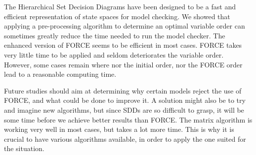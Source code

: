 \documentclass[12pt]{report}
\begin{document}
The Hierarchical Set Decision Diagrams have been designed to be a fast and efficient representation of state spaces for model checking. We showed that applying a pre-processing algorithm to determine an optimal variable order can sometimes greatly reduce the time needed to run the model checker. The enhanced version of FORCE seems to be efficient in most cases. FORCE takes very little time to be applied and seldom deteriorates the variable order. However, some cases remain where nor the initial order, nor the FORCE order lead to a reasonable computing time.

Future studies should aim at determining why certain models reject the use of FORCE, and what could be done to improve it. A solution might also be to try and imagine new algorithms, but since SDDs are so difficult to grasp, it will be some time before we achieve better results than FORCE. The matrix algorithm is working very well in most cases, but takes a lot more time. This is why it is crucial to have various algorithms available, in order to apply the one suited for the situation.

\printbibliography
\end{document}
